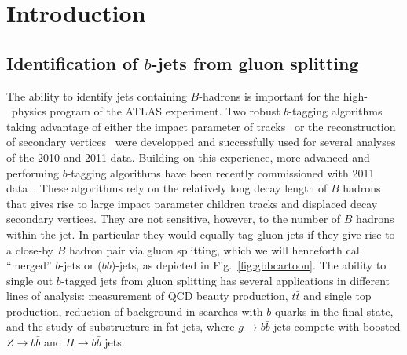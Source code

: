 %
%
\chapter{Introduction}


\section{Identification of $b$-jets from gluon splitting}\label{sec:introduction}


The ability to identify jets containing $B$-hadrons is important for the high-\pt\ physics program of the ATLAS experiment. Two robust $b$-tagging algorithms taking
advantage of either the impact parameter of tracks~\cite{ATLAS-CONF-2010-091} or the reconstruction of secondary vertices~\cite{ATLAS-CONF-2010-042} were developped and successfully used for several analyses of the 2010 and 2011 data. Building on this experience, more advanced and performing $b$-tagging algorithms have been recently commissioned with 2011 data~\cite{ATLAS-CONF-2011-102}.
These algorithms rely on the relatively long decay length of $B$ hadrons that gives rise to large impact parameter children tracks and displaced decay secondary vertices. They are not sensitive, however, to the number of $B$ hadrons within the jet. In particular they would equally tag gluon jets if they give rise to a close-by $B$ hadron pair via gluon splitting, which we will henceforth call ``merged'' $b$-jets or ($bb$)-jets, as depicted in Fig.~\ref{fig:gbbcartoon}. The ability to single out $b$-tagged jets from gluon splitting has several applications in different lines of analysis: measurement of QCD beauty production, $t\bar{t}$ and single top production, reduction of background in searches with $b$-quarks in the final state, and the study of substructure in fat jets, where $g\rightarrow b\bar{b}$ jets compete with boosted $Z\rightarrow b\bar{b}$ and $H\rightarrow b\bar{b}$ jets.
